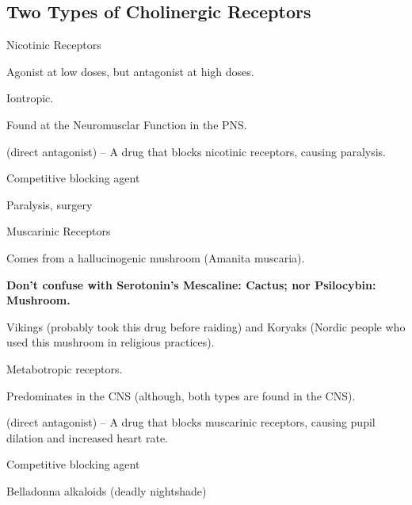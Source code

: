 \subsection{Two Types of Cholinergic Receptors}

\begin{coloredlist}
    \item Nicotinic Receptors
    \begin{coloredlist}
        \item Agonist at low doses, but antagonist at high doses.
        \item Iontropic.
        \item Found at the Neuromusclar Function in the PNS.
        \item {} (direct antagonist) -- A drug that blocks nicotinic receptors, causing paralysis.
        \begin{coloredlist}
            \item Competitive blocking agent
            \item Paralysis, surgery
        \end{coloredlist}
    \end{coloredlist}
    \item Muscarinic Receptors
    \begin{coloredlist}
        \item Comes from a hallucinogenic mushroom (Amanita muscaria).
        \begin{coloredlist}
            \item \textbf{Don't confuse with Serotonin's Mescaline: Cactus; nor Psilocybin: Mushroom.}
        \end{coloredlist}
        \item Vikings (probably took this drug before raiding) and Koryaks (Nordic people who used this mushroom in religious practices).
        \item Metabotropic receptors.
        \item Predominates in the CNS (although, both types are found in the CNS).
        \item {} (direct antagonist) -- A drug that blocks muscarinic receptors, causing pupil dilation and increased heart rate.
        \begin{coloredlist}
            \item Competitive blocking agent
            \item Belladonna alkaloids (deadly nightshade)
        \end{coloredlist}
    \end{coloredlist}
\end{coloredlist}


